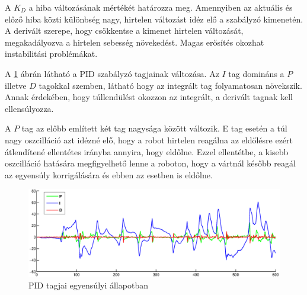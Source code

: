 A $K_{D}$ a hiba változásának mértékét határozza meg. Amennyiben az aktuális és előző hiba közti különbség nagy, hirtelen változást idéz elő a szabályzó kimenetén. A derivált szerepe, hogy csökkentse a kimenet hirtelen változását, megakadályozva a hirtelen sebesség növekedést. Magas erősítés okozhat instabilitási problémákat.

A \ref{pidFig} ábrán látható a PID szabályzó tagjainak változása. Az $I$ tag domináns a $P$ illetve $D$ tagokkal szemben, látható hogy az integrált tag folyamatosan növekszik. Annak érdekében, hogy túllendülést okozzon az integrált, a derivált tagnak kell ellensúlyozza.

A $P$ tag az előbb említett két tag nagysága között változik. E tag esetén a túl nagy oszcilláció azt idézné elő, hogy a robot hirtelen reagálna az eldőlésre ezért átlendítené ellentétes irányba annyira, hogy eldőlne. Ezzel ellentétbe, a kisebb oszcilláció hatására megfigyelhető lenne a roboton, hogy a vártnál később reagál az egyensúly korrigálására és ebben az esetben is eldőlne.

\begin{figure}[!htb]
	\begin{center}
		\includegraphics[width=1.0\linewidth]{images/pid.eps}
	\end{center}
	\caption{PID tagjai egyensúlyi állapotban}
	\label{pidFig}
\end{figure}
